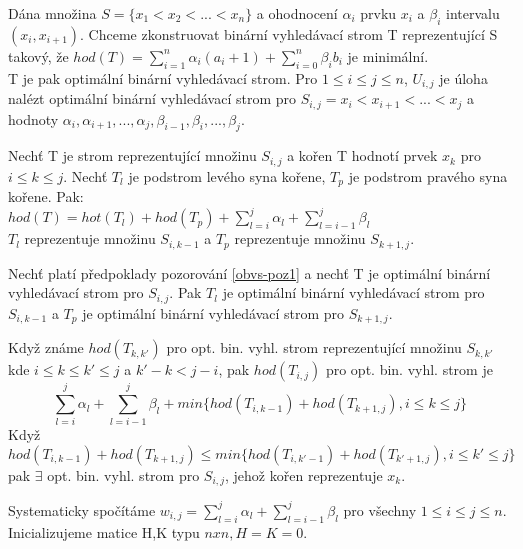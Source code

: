 Dána množina $S = \{x_1 < x_2 < ... < x_n \}$ a ohodnocení $\alpha_i$ prvku
$x_i$ a $\beta_i$ intervalu $(x_i,x_{i+1})$.
Chceme zkonstruovat binární vyhledávací strom T reprezentující S takový,
že $hod(T)= \sum_{i=1}^{n} \alpha_i(a_i + 1) + \sum_{i=0}^{n} \beta_i b_i$
je minimální. \\
T je pak optimální binární vyhledávací strom.
Pro $1 \leq i \leq j \leq n$, $U_{i,j}$ je úloha nalézt optimální binární
vyhledávací strom pro $S_{i,j} = {x_i < x_{i+1} < ... < x_j}$ a hodnoty 
$\alpha_i, \alpha_{i+1}, ..., \alpha_j, \beta_{i-1}, \beta_i, ..., \beta_j$.

\par
\begin{pozorov}
\label{obvs-poz1}
Nechť T je strom reprezentující množinu $S_{i,j}$ a kořen T
hodnotí prvek $x_k$ pro $i \leq k \leq j$. Nechť $T_l$ je podstrom levého
syna kořene, $T_p$ je podstrom pravého syna kořene. Pak: \\
$hod(T) = hot(T_l) + hod(T_p) + \sum_{l=i}^{j} \alpha_l + \sum_{l=i-1}^{j}
\beta_l$ \\
$T_l$ reprezentuje množinu $S_{i,k-1}$ a $T_p$ reprezentuje množinu $S_{k+1,j}$.
\end{pozorov}

\par
\begin{pozorov}
Nechť platí předpoklady pozorování
\ref{obvs-poz1}
a nechť T je optimální
binární vyhledávací strom pro $S_{i,j}$. Pak $T_l$ je optimální
binární vyhledávací strom pro $S_{i,k-1}$ a $T_p$ je optimální
binární vyhledávací strom pro $S_{k+1,j}$.
\end{pozorov}

\par
\begin{pozorov}
Když známe $hod(T_{k,k'})$ pro opt. bin. vyhl. strom
reprezentující množinu $S_{k,k'}$ kde $i \leq k \leq k' \leq j$ a $k'-k <
j-i$, pak $hod(T_{i,j})$ pro opt. bin. vyhl. strom je \\
$$
\sum_{l=i}^{j} \alpha_l + \sum_{l=i-1}^{j} \beta_l + min\{hod(T_{i,k-1}) +
hod(T_{k+1,j}), i \leq k \leq j\}
$$
Když 
$$
hod(T_{i,k-1}) + hod(T_{k+1,j})
\leq min\{hod(T_{i,k'-1}) + hod(T_{k'+1,j}), i \leq k' \leq j\}
$$
pak $\exists$ opt. bin. vyhl. strom pro $S_{i,j}$,
jehož kořen reprezentuje $x_k$.
\end{pozorov}

\par
Systematicky spočítáme $w_{i,j} = \sum_{l=i}^{j} \alpha_l + \sum_{l=i-1}^{j}
\beta_l$ pro všechny $1 \leq i \leq j \leq n$. Inicializujeme matice H,K
typu $n x n, H = K = 0$.

